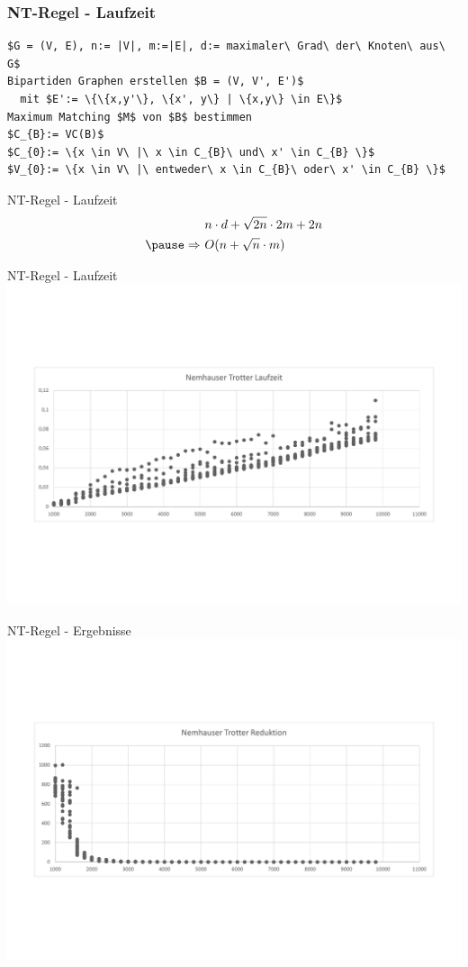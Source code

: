 \documentclass{beamer}
\begin{document}
\begin{frame}[fragile]
\frametitle{NT-Regel - Laufzeit}
\begin{lstlisting}[mathescape = true, basicstyle=\ttfamily]
$G = (V, E), n:= |V|, m:=|E|, d:= maximaler\ Grad\ der\ Knoten\ aus\ G$
Bipartiden Graphen erstellen $B = (V, V', E')$ 
  mit $E':= \{\{x,y'\}, \{x', y\} | \{x,y\} \in E\}$ 
Maximum Matching $M$ von $B$ bestimmen 
$C_{B}:= VC(B)$ 
$C_{0}:= \{x \in V\ |\ x \in C_{B}\ und\ x' \in C_{B} \}$ 
$V_{0}:= \{x \in V\ |\ entweder\ x \in C_{B}\ oder\ x' \in C_{B} \}$ 
\end{lstlisting}
\end{frame}
\begin{frame}{NT-Regel - Laufzeit}
\begin{align*}
&\ n \cdot d + \sqrt{2n} \cdot 2m + 2n\\ \pause
\Rightarrow &\ O(n + \sqrt{n} \cdot m)
\end{align*}
\end{frame}


\begin{frame}{NT-Regel - Laufzeit}
\includegraphics[scale= .4]{analysis1000_TrottNormal_runtime.pdf} 
\end{frame}
\begin{frame}{NT-Regel - Ergebnisse}
\includegraphics[scale= .4]{analysisTrott.pdf} 
\end{frame}
\end{document}
